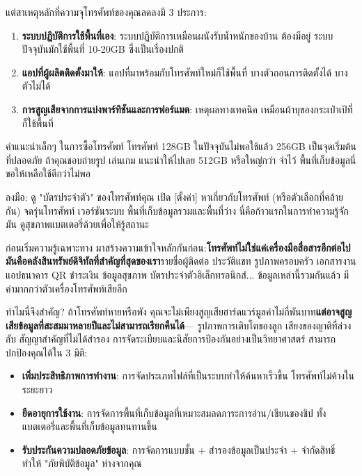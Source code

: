 แต่สาเหตุหลักที่ความจุโทรศัพท์ของคุณลดลงมี 3 ประการ:

\begin{enumerate}
  \item \textbf{ระบบปฏิบัติการใช้พื้นที่เอง}: ระบบปฏิบัติการเหมือนผนังรับน้ำหนักของบ้าน ต้องมีอยู่ ระบบปัจจุบันมักใช้พื้นที่ 10-20GB ซึ่งเป็นเรื่องปกติ
  \item \textbf{แอปที่ผู้ผลิตติดตั้งมาให้}: แอปที่มาพร้อมกับโทรศัพท์ใหม่ก็ใช้พื้นที่ บางตัวถอนการติดตั้งได้ บางตัวไม่ได้
  \item \textbf{การสูญเสียจากการแบ่งพาร์ทิชันและการฟอร์แมต}: เหตุผลทางเทคนิค เหมือนผ้าบุของกระเป๋าเป้ที่ก็ใช้พื้นที่
\end{enumerate}

\begin{tcbinfo}{คำแนะนำเล็กๆ ในการซื้อโทรศัพท์}
โทรศัพท์ 128GB ในปัจจุบันไม่พอใช้แล้ว 256GB เป็นจุดเริ่มต้นที่ปลอดภัย ถ้าคุณชอบถ่ายรูป เล่นเกม แนะนำให้ไปเลย 512GB หรือใหญ่กว่า จำไว้ พื้นที่เก็บข้อมูลนี่ ขอให้เหลือใช้ดีกว่าไม่พอ

\end{tcbinfo}

\begin{tcbpractice}{ลงมือ: ดู "บัตรประจำตัว" ของโทรศัพท์คุณ}
เปิด [ตั้งค่า] หาเกี่ยวกับโทรศัพท์ (หรือตัวเลือกที่คล้ายกัน) จดรุ่นโทรศัพท์ เวอร์ชันระบบ พื้นที่เก็บข้อมูลรวมและพื้นที่ว่าง นี่คือก้าวแรกในการทำความรู้จักมัน ดูสุขภาพแบตเตอรี่ด้วยเพื่อให้รู้สถานะ

\end{tcbpractice}


ก่อนเริ่มความรู้เฉพาะทาง มาสร้างความเข้าใจหลักกันก่อน:\textbf{โทรศัพท์ไม่ใช่แค่เครื่องมือสื่อสารอีกต่อไป มันคือคลังสินทรัพย์ดิจิทัลที่สำคัญที่สุดของเรา}รายชื่อผู้ติดต่อ ประวัติแชท รูปภาพครอบครัว เอกสารงาน แอปธนาคาร QR ชำระเงิน ข้อมูลสุขภาพ บัตรประจำตัวอิเล็กทรอนิกส์... ข้อมูลเหล่านี้รวมกันแล้ว มีค่ามากกว่าตัวเครื่องโทรศัพท์เสียอีก

\begin{tcbinfo}{ทำไมนี่จึงสำคัญ?}
ถ้าโทรศัพท์หายหรือพัง คุณจะไม่เพียงสูญเสียฮาร์ดแวร์มูลค่าไม่กี่พันบาท\textbf{แต่อาจสูญเสียข้อมูลที่สะสมมาหลายปีและไม่สามารถเรียกคืนได้}— รูปภาพการเติบโตของลูก เสียงของญาติที่ล่วงลับ สัญญาสำคัญที่ไม่ได้สำรอง การจัดระเบียบและนิสัยการป้องกันอย่างเป็นวิทยาศาสตร์ สามารถปกป้องคุณได้ใน 3 มิติ:

\begin{itemize}
  \item \textbf{เพิ่มประสิทธิภาพการทำงาน}: การจัดประเภทไฟล์ที่เป็นระบบทำให้ค้นหาเร็วขึ้น โทรศัพท์ไม่ค้างในระยะยาว
  \item \textbf{ยืดอายุการใช้งาน}: การจัดการพื้นที่เก็บข้อมูลที่เหมาะสมลดภาระการอ่าน/เขียนของชิป ทั้งแบตเตอรี่และพื้นที่เก็บข้อมูลทนทานขึ้น
  \item \textbf{รับประกันความปลอดภัยข้อมูล}: การจัดการแบบชั้น + สำรองข้อมูลเป็นประจำ + จำกัดสิทธิ์ ทำให้ "ภัยพิบัติข้อมูล" ห่างจากคุณ
\end{itemize}

\end{tcbinfo}

